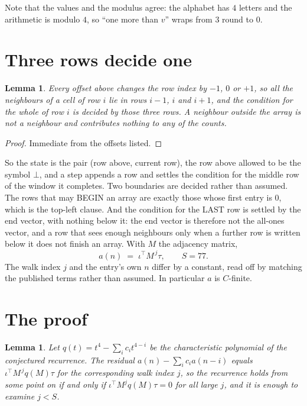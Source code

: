 \documentclass[11pt,a4paper]{article}
\theoremstyle{plain}
\newtheorem{lemma}[theorem]{Lemma}
\theoremstyle{definition}
\begin{document}
Note that the values and the modulus agree: the alphabet has $4$ letters and the arithmetic
is modulo $4$, so ``one more than $v$'' wraps from $3$ round to $0$.

\section{Three rows decide one}

\begin{lemma}\label{lem:win}
Every offset above changes the row index by $-1$, $0$ or $+1$, so all the neighbours of a cell
of row $i$ lie in rows $i-1$, $i$ and $i+1$, and the condition for the whole of row $i$ is
decided by those three rows. A neighbour outside the array is not a neighbour and contributes
nothing to any of the counts.
\end{lemma}

\begin{proof}
Immediate from the offsets listed.
\end{proof}

So the state is the pair (row above, current row), the row above allowed to be the symbol
$\bot$, and a step appends a row and settles the condition for the middle row of the window it
completes. Two boundaries are decided rather than assumed. The rows that may BEGIN an array are
exactly those whose first entry is $0$, which is the top-left clause. And the condition for the
LAST row is settled by the end vector, with nothing below it: the end vector is therefore not
the all-ones vector, and a row that sees enough neighbours only when a further row is written
below it does not finish an array. With $M$ the adjacency matrix,
\[
a(n)\;=\;\iota^{\!\top}M^{\,j}\tau ,\qquad S=77.
\]
The walk index $j$ and the entry's own $n$ differ by a constant, read off by matching the
published terms rather than assumed. In particular $a$ is $C$-finite.

\section{The proof}

\begin{lemma}\label{lem:crit}
Let $q(t)=t^{4}-\sum_i c_it^{4-i}$ be the characteristic polynomial of the
conjectured recurrence. The residual $a(n)-\sum_ic_ia(n-i)$ equals
$\iota^{\!\top}M^{\,j}q(M)\tau$ for the corresponding walk index $j$, so the recurrence
holds from some point on if and only if $\iota^{\!\top}M^{j}q(M)\tau=0$ for all large $j$,
and it is enough to examine $j<S$.
\end{lemma}
\end{document}
